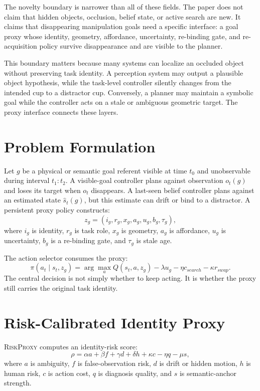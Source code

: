\documentclass{article}
\newcommand{\method}{\textsc{RiskProxy}\xspace}
\begin{document}
The novelty boundary is narrower than all of these fields. The paper does not claim that hidden objects, occlusion, belief state, or active search are new. It claims that disappearing manipulation goals need a specific interface: a goal proxy whose identity, geometry, affordance, uncertainty, re-binding gate, and re-acquisition policy survive disappearance and are visible to the planner.

This boundary matters because many systems can localize an occluded object without preserving task identity. A perception system may output a plausible object hypothesis, while the task-level controller silently changes from the intended cup to a distractor cup. Conversely, a planner may maintain a symbolic goal while the controller acts on a stale or ambiguous geometric target. The proxy interface connects these layers.

\section{Problem Formulation}

Let $g$ be a physical or semantic goal referent visible at time $t_0$ and unobservable during interval $t_1:t_2$. A visible-goal controller plans against observation $o_t(g)$ and loses its target when $o_t$ disappears. A last-seen belief controller plans against an estimated state $\hat{s}_t(g)$, but this estimate can drift or bind to a distractor. A persistent proxy policy constructs:
\[
    z_g = (i_g, r_g, x_g, a_g, u_g, b_g, \tau_g),
\]
where $i_g$ is identity, $r_g$ is task role, $x_g$ is geometry, $a_g$ is affordance, $u_g$ is uncertainty, $b_g$ is a re-binding gate, and $\tau_g$ is stale age.

The action selector consumes the proxy:
\[
    \pi(a_t \mid s_t, z_g) = \arg\max_a Q(s_t,a,z_g) - \lambda u_g - \eta c_{search} - \kappa r_{swap}.
\]
The central decision is not simply whether to keep acting. It is whether the proxy still carries the original task identity.

\section{Risk-Calibrated Identity Proxy}

\method computes an identity-risk score:
\[
\rho = \alpha a + \beta f + \gamma d + \delta h + \kappa c - \eta q - \mu s,
\]
where $a$ is ambiguity, $f$ is false-observation risk, $d$ is drift or hidden motion, $h$ is human risk, $c$ is action cost, $q$ is diagnosis quality, and $s$ is semantic-anchor strength.
\end{document}
